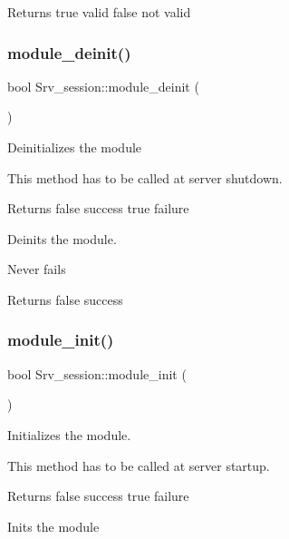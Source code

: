 \begin{DoxyReturn}{Returns}
true valid false not valid 
\end{DoxyReturn}
\mbox{\label{classSrv__session_a1c54d3bf9fc6ae6236b8b18b5354b714}} 
\subsubsection{\texorpdfstring{module\+\_\+deinit()}{module\_deinit()}}
{\footnotesize\ttfamily bool Srv\+\_\+session\+::module\+\_\+deinit (\begin{DoxyParamCaption}{ }\end{DoxyParamCaption})\hspace{0.3cm}{\ttfamily [static]}}

Deinitializes the module

This method has to be called at server shutdown.

\begin{DoxyReturn}{Returns}
false success true failure
\end{DoxyReturn}
Deinits the module.

Never fails

\begin{DoxyReturn}{Returns}
false success 
\end{DoxyReturn}
\mbox{\label{classSrv__session_aa0dbb3e216c720bb38d81b172d6118de}} 
\subsubsection{\texorpdfstring{module\+\_\+init()}{module\_init()}}
{\footnotesize\ttfamily bool Srv\+\_\+session\+::module\+\_\+init (\begin{DoxyParamCaption}{ }\end{DoxyParamCaption})\hspace{0.3cm}{\ttfamily [static]}}

Initializes the module.

This method has to be called at server startup.

\begin{DoxyReturn}{Returns}
false success true failure
\end{DoxyReturn}
Inits the module

